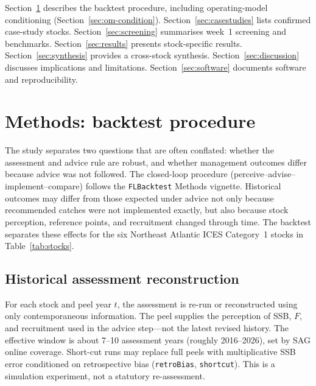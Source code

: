 \documentclass[11pt,a4paper]{extarticle}
\begin{document}
Section~\ref{sec:methods} describes the backtest procedure, including
operating-model conditioning (Section~\ref{sec:om-condition}).
Section~\ref{sec:casestudies} lists confirmed case-study stocks.
Section~\ref{sec:screening} summarises week~1 screening and benchmarks.
Section~\ref{sec:results} presents stock-specific results.
Section~\ref{sec:synthesis} provides a cross-stock synthesis.
Section~\ref{sec:discussion} discusses implications and limitations.
Section~\ref{sec:software} documents software and reproducibility.

\section{Methods: backtest procedure}
\label{sec:methods}

% 

The study separates two questions that are often conflated: whether the
assessment and advice rule are robust, and whether management outcomes differ
because advice was not followed. The closed-loop procedure (perceive--advise--
implement--compare) follows the \texttt{FLBacktest} Methods vignette. Historical
outcomes may differ from those expected under advice not only because recommended
catches were not implemented exactly, but also because stock perception,
reference points, and recruitment changed through time. The backtest separates
these effects for the six Northeast Atlantic ICES Category~1 stocks in
Table~\ref{tab:stocks}.

\subsection{Historical assessment reconstruction}


For each stock and peel year \(t\), the assessment is re-run or reconstructed
using only contemporaneous information. The peel supplies the perception of
SSB, \(F\), and recruitment used in the advice step---not the latest revised
history. The effective window is about 7--10 assessment years (roughly
2016--2026), set by SAG online coverage. Short-cut runs may replace full peels
with multiplicative SSB error conditioned on retrospective bias
(\texttt{retroBias}, \texttt{shortcut}). This is a simulation experiment, not a
statutory re-assessment.
\end{document}
